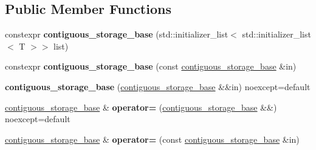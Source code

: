 \subsection*{Public Member Functions}
\begin{DoxyCompactItemize}
\item 
\mbox{\label{classsequoia_1_1data__structures_1_1contiguous__storage__base_afad22bdd11bb7691fc86fdbcd1d3ee1d}} 
constexpr {\bfseries contiguous\+\_\+storage\+\_\+base} (std\+::initializer\+\_\+list$<$ std\+::initializer\+\_\+list$<$ T $>$$>$ list)
\item 
\mbox{\label{classsequoia_1_1data__structures_1_1contiguous__storage__base_a8604381987b12f1bec57688f3e2ba39a}} 
constexpr {\bfseries contiguous\+\_\+storage\+\_\+base} (const \mbox{\hyperlink{classsequoia_1_1data__structures_1_1contiguous__storage__base}{contiguous\+\_\+storage\+\_\+base}} \&in)
\item 
\mbox{\label{classsequoia_1_1data__structures_1_1contiguous__storage__base_af59ba6ff3f0b45537ed63ed601a260c7}} 
{\bfseries contiguous\+\_\+storage\+\_\+base} (\mbox{\hyperlink{classsequoia_1_1data__structures_1_1contiguous__storage__base}{contiguous\+\_\+storage\+\_\+base}} \&\&in) noexcept=default
\item 
\mbox{\label{classsequoia_1_1data__structures_1_1contiguous__storage__base_adca17a53792982ddcdabe0992530c1c8}} 
\mbox{\hyperlink{classsequoia_1_1data__structures_1_1contiguous__storage__base}{contiguous\+\_\+storage\+\_\+base}} \& {\bfseries operator=} (\mbox{\hyperlink{classsequoia_1_1data__structures_1_1contiguous__storage__base}{contiguous\+\_\+storage\+\_\+base}} \&\&) noexcept=default
\item 
\mbox{\label{classsequoia_1_1data__structures_1_1contiguous__storage__base_adc2a2fdeae62002f3619c04afd8f2808}} 
\mbox{\hyperlink{classsequoia_1_1data__structures_1_1contiguous__storage__base}{contiguous\+\_\+storage\+\_\+base}} \& {\bfseries operator=} (const \mbox{\hyperlink{classsequoia_1_1data__structures_1_1contiguous__storage__base}{contiguous\+\_\+storage\+\_\+base}} \&in)
$$
\end{DoxyCompactItemize}
